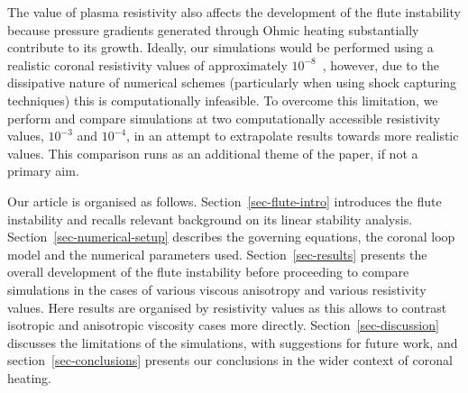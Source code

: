 \documentclass[fleqn,usenatbib]{mnras}
\newcommand{\rev}[1]{{\color{red} {#1}}}
\begin{document}
\rev{The value of plasma resistivity also affects the
development of the flute instability because pressure gradients
generated through Ohmic heating substantially contribute to its growth.
Ideally, our simulations would be performed using a realistic coronal
resistivity values of approximately
$10^{-8}$~\citep{craigAnisotropicViscousDissipation2009a}, however, due
to the dissipative nature of numerical schemes (particularly when using shock
capturing techniques) this is computationally infeasible.
To overcome this limitation, we perform and compare simulations at two computationally
accessible resistivity values, $10^{-3}$ and $10^{-4}$,
in an attempt to extrapolate results towards more realistic values.
This comparison runs as an additional theme of the paper,
if not a primary aim.}
%

Our article is organised as follows. Section~\ref{sec-flute-intro} introduces
the flute instability and \rev{recalls relevant background on its linear stability analysis}.
Section~\ref{sec-numerical-setup} describes the governing equations,
the coronal loop model and the numerical parameters used. Section~\ref{sec-results}
presents the overall development of the flute instability before
\rev{proceeding to compare simulations in the cases of various viscous
anisotropy and various resistivity values. Here results are
organised by resistivity values as this allows to contrast isotropic
and anisotropic viscosity cases more directly.}
Section~\ref{sec-discussion} discusses the limitations of the simulations, with
suggestions for future work, and section~\ref{sec-conclusions} presents our
conclusions in the wider context of coronal heating.
\end{document}
